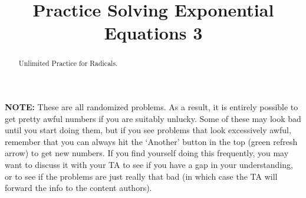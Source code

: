 \documentclass{ximeraXloud}
\title{Practice Solving Exponential Equations 3}
\begin{document}
\begin{abstract}
    Unlimited Practice for Radicals.
\end{abstract}
\maketitle

\textbf{NOTE:} These are all randomized problems. As a result, it is entirely possible to get pretty awful numbers if you are suitably unlucky. Some of these may look bad until you start doing them, but if you see problems that look excessively awful, remember that you can always hit the `Another' button in the top (green refresh arrow) to get new numbers. If you find yourself doing this frequently, you may want to discuss it with your TA to see if you have a gap in your understanding, or to see if the problems are just really that bad (in which case the TA will forward the info to the content authors).

%
\end{document}

